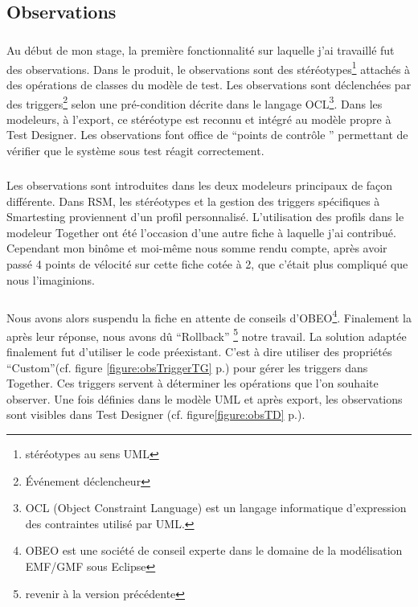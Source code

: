 \subsection{Observations}
\subparagraph*{}
Au début de mon stage, la première fonctionnalité sur laquelle j'ai travaillé fut des observations. Dans le produit, le observations sont des stéréotypes\footnote{stéréotypes au sens UML} attachés à des opérations de classes du modèle de test. Les observations sont déclenchées par des triggers\footnote{Événement déclencheur} selon une pré-condition décrite dans le langage OCL\footnote{OCL (Object Constraint Language) est un langage informatique d'expression des contraintes utilisé par UML.}. Dans les modeleurs, à l'export, ce stéréotype est reconnu et intégré au modèle propre à Test Designer. Les observations font office de ``points de contrôle '' permettant de vérifier que le système sous test réagit correctement.
\subparagraph*{}
Les observations sont introduites dans les deux modeleurs principaux de façon différente. Dans RSM, les stéréotypes et la gestion des triggers spécifiques à Smartesting proviennent d'un profil personnalisé. L'utilisation des profils dans le modeleur Together ont été l'occasion d'une autre fiche à laquelle j'ai contribué. Cependant mon binôme et moi-même nous somme rendu compte, après avoir passé 4 points de vélocité sur cette fiche cotée à 2, que c'était plus compliqué que nous l'imaginions.
\subparagraph*{}
Nous avons alors suspendu la fiche en attente de conseils d'OBEO\footnote{OBEO est une société de conseil experte dans le domaine de la modélisation EMF/GMF sous Eclipse}. Finalement la après leur réponse, nous avons dû ``Rollback'' \footnote{revenir à la version précédente} notre travail. La solution adaptée finalement fut d'utiliser le code préexistant. C'est à dire utiliser des propriétés ``Custom''(cf. figure \ref{figure:obsTriggerTG} p.\pageref{figure:obsTriggerTG}) pour gérer les triggers dans Together. Ces triggers servent à déterminer les opérations que l'on souhaite observer. Une fois définies dans le modèle UML et après export, les observations sont visibles dans Test Designer (cf. figure\ref{figure:obsTD} p.\pageref{figure:obsTD}).
